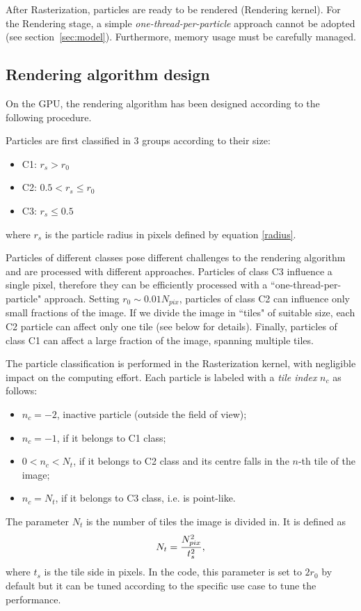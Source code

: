 \documentclass[11pt]{article}
\begin{document}
After Rasterization, particles are ready to be rendered (Rendering kernel).
For the Rendering stage, a simple {\it one-thread-per-particle} approach
cannot be adopted (see section~\ref{sec:model}). Furthermore, memory usage must be carefully managed.

\subsection{Rendering algorithm design}
\label{sec:design}

On the GPU, the rendering algorithm has been designed according to the following procedure.

Particles are first classified in 3 groups according to their size:
\begin{itemize}
\item 
C1: $r_s > r_0$
\item
C2: $0.5 < r_s \le r_0$
\item
C3: $r_s \le 0.5$
\end{itemize}
where $r_s$ is the particle radius in pixels defined by equation \eqref{radius}.

Particles of different classes pose different challenges to the rendering 
algorithm and are processed with different approaches. Particles of class C3 
influence a single pixel, therefore they can be efficiently 
processed with a ``one-thread-per-particle" approach. Setting $r_0 \sim 0.01 N_{pix}$, 
particles of class C2 can influence only small fractions of the image. If 
we divide the image in ``tiles" of suitable size, each C2 particle can affect 
only one tile (see below for details). Finally, particles of class C1 can affect 
a large fraction of the image, spanning multiple tiles.

The particle classification is performed in the Rasterization kernel, with negligible impact
on the computing effort. Each particle is labeled
with a {\it tile index} $n_c$ as follows:
\begin{itemize}
\item 
$n_c = -2$, inactive particle (outside the field of view);
\item
$n_c = -1$, if it belongs to C1 class; 
\item
$0 < n_c < N_t$, if it belongs to C2 class and its centre falls in the $n$-th tile of the image;  
\item
$n_c = N_t$, if it belongs to C3 class, i.e. is point-like.
\end{itemize}
The parameter $N_t$ is the number of tiles the image is divided in. It is defined as
\begin{equation}
N_t = {N_{pix}^2\over t_s^2},   
\end{equation}
where $t_s$ is the tile side in pixels. In the code, this parameter is set to $2r_0$ 
by default but it can be tuned according to the specific use case to tune the performance. 
\end{document}
